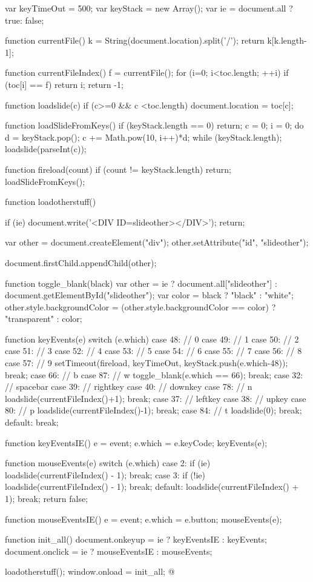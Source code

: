 var keyTimeOut = 500;
var keyStack = new Array();
var ie = document.all ? true: false;

function currentFile() {
  k = String(document.location).split('/');
  return k[k.length-1];
}

function currentFileIndex() {
  f = currentFile();
  for (i=0; i<toc.length; ++i) {
    if (toc[i] == f)
      return i;
  }
  return -1;
}

function loadslide(c) {
  if (c>=0 && c <toc.length) {
    document.location = toc[c];
  }
}

function loadSlideFromKeys() {
  if (keyStack.length == 0) return;
  c = 0;
  i = 0;
  do {
    d = keyStack.pop();
    c += Math.pow(10, i++)*d;
  } while (keyStack.length);
  loadslide(parseInt(c));
}

function fireload(count) {
  if (count != keyStack.length) return;
  loadSlideFromKeys();
}

function loadotherstuff() {
  if (ie) {
    document.write('<DIV ID=slideother></DIV>');
    return;
  }

  var other = document.createElement("div");
  other.setAttribute("id", "slideother");

  document.firstChild.appendChild(other);
}

function toggle_blank(black) {
  var other = ie ?  document.all["slideother"] : document.getElementById("slideother");
  var color = black ?  "black" : "white";
  other.style.backgroundColor = (other.style.backgroundColor == color) ?
  "transparent" : color;
}

function keyEvents(e) {
  switch (e.which) {
    case 48: // 0
    case 49: // 1
    case 50: // 2
    case 51: // 3
    case 52: // 4
    case 53: // 5
    case 54: // 6
    case 55: // 7
    case 56: // 8
    case 57: // 9
      setTimeout(fireload, keyTimeOut, keyStack.push(e.which-48));
      break;
    case 66: // b
    case 87: // w
      toggle_blank(e.which == 66);
      break;
    case 32: // spacebar
    case 39: // rightkey
    case 40: // downkey
    case 78: // n
      loadslide(currentFileIndex()+1);
      break;
    case 37: // leftkey
    case 38: // upkey
    case 80: // p
      loadslide(currentFileIndex()-1);
      break;
    case 84: // t
      loadslide(0);
      break;
    default:
      break;
  }
}

function keyEventsIE() {
  e = event;
  e.which = e.keyCode;
  keyEvents(e);
}

function mouseEvents(e) {
  switch (e.which) {
    case 2:  if (ie)  loadslide(currentFileIndex() - 1); break;
    case 3:  if (!ie) loadslide(currentFileIndex() - 1); break;
    default: loadslide(currentFileIndex() + 1); break;
  }
  return false;
}

function mouseEventsIE() {
  e = event;
  e.which = e.button;
  mouseEvents(e);
}

function init_all() {
  document.onkeyup = ie ? keyEventsIE : keyEvents;
  document.onclick = ie ? mouseEventsIE : mouseEvents;
}

loadotherstuff();
window.onload = init_all;
@
\ifx{}
\else
{}
\fi
